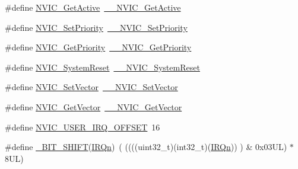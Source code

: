 \begin{DoxyCompactItemize}
\item 
\#define \mbox{\hyperlink{group___c_m_s_i_s___core___n_v_i_c_functions_ga58ad3f352f832235ab3b192ff4745320}{N\+V\+I\+C\+\_\+\+Get\+Active}}~\mbox{\hyperlink{group___c_m_s_i_s___core___n_v_i_c_functions_gaa2837003c28c45abf193fe5e8d27f593}{\+\_\+\+\_\+\+N\+V\+I\+C\+\_\+\+Get\+Active}}
\item 
\#define \mbox{\hyperlink{group___c_m_s_i_s___core___n_v_i_c_functions_gae0e9d0e2f7b6133828c71b57d4941c35}{N\+V\+I\+C\+\_\+\+Set\+Priority}}~\mbox{\hyperlink{group___c_m_s_i_s___core___n_v_i_c_functions_ga505338e23563a9c074910fb14e7d45fd}{\+\_\+\+\_\+\+N\+V\+I\+C\+\_\+\+Set\+Priority}}
\item 
\#define \mbox{\hyperlink{group___c_m_s_i_s___core___n_v_i_c_functions_gaf59b9d0a791d2157abb319753953eceb}{N\+V\+I\+C\+\_\+\+Get\+Priority}}~\mbox{\hyperlink{group___c_m_s_i_s___core___n_v_i_c_functions_gaeb9dc99c8e7700668813144261b0bc73}{\+\_\+\+\_\+\+N\+V\+I\+C\+\_\+\+Get\+Priority}}
\item 
\#define \mbox{\hyperlink{group___c_m_s_i_s___core___n_v_i_c_functions_ga6aa0367d3642575610476bf0366f0c48}{N\+V\+I\+C\+\_\+\+System\+Reset}}~\mbox{\hyperlink{group___c_m_s_i_s___core___n_v_i_c_functions_ga49f66a3782cbff3b821bd9802cd046f5}{\+\_\+\+\_\+\+N\+V\+I\+C\+\_\+\+System\+Reset}}
\item 
\#define \mbox{\hyperlink{group___c_m_s_i_s___core___n_v_i_c_functions_ga804af63bb4c4c317387897431814775d}{N\+V\+I\+C\+\_\+\+Set\+Vector}}~\mbox{\hyperlink{group___c_m_s_i_s___core___n_v_i_c_functions_ga0df355460bc1783d58f9d72ee4884208}{\+\_\+\+\_\+\+N\+V\+I\+C\+\_\+\+Set\+Vector}}
\item 
\#define \mbox{\hyperlink{group___c_m_s_i_s___core___n_v_i_c_functions_ga955eb1c33a3dcc62af11a8385e8c0fc8}{N\+V\+I\+C\+\_\+\+Get\+Vector}}~\mbox{\hyperlink{group___c_m_s_i_s___core___n_v_i_c_functions_ga44b665d2afb708121d9b10c76ff00ee5}{\+\_\+\+\_\+\+N\+V\+I\+C\+\_\+\+Get\+Vector}}
\item 
\#define \mbox{\hyperlink{group___c_m_s_i_s___core___n_v_i_c_functions_ga8045d905a5ca57437d8e6f71ffcb6df5}{N\+V\+I\+C\+\_\+\+U\+S\+E\+R\+\_\+\+I\+R\+Q\+\_\+\+O\+F\+F\+S\+ET}}~16
\item 
\#define \mbox{\hyperlink{group___c_m_s_i_s___core___n_v_i_c_functions_ga53c75b28823441c6153269f0ecbed878}{\+\_\+\+B\+I\+T\+\_\+\+S\+H\+I\+FT}}(\mbox{\hyperlink{group___interrupt__vector__numbers_ga666eb0caeb12ec0e281415592ae89083}{I\+R\+Qn}})~(  ((((uint32\+\_\+t)(int32\+\_\+t)(\mbox{\hyperlink{group___interrupt__vector__numbers_ga666eb0caeb12ec0e281415592ae89083}{I\+R\+Qn}}))         )      \&  0x03\+U\+L) $\ast$ 8\+U\+L)

\end{DoxyCompactItemize}
